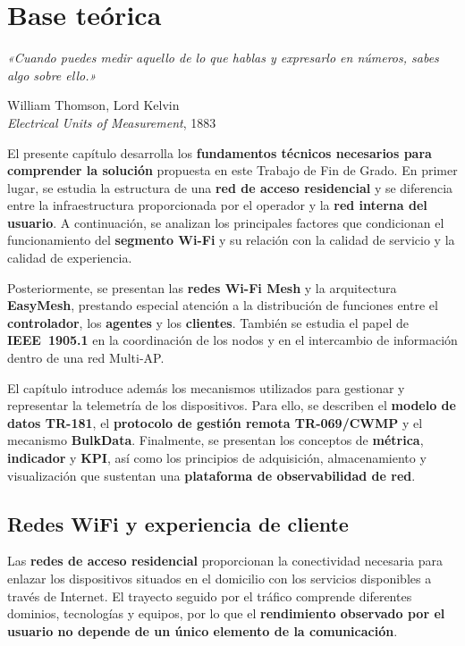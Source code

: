%
%

\chapter{Base teórica}
\label{cha:base-teorica}

\epigraph{
    \textit{«Cuando puedes medir aquello de lo que hablas y expresarlo
    en números, sabes algo sobre ello.»}
}{
    William Thomson, Lord Kelvin\\
    \textit{Electrical Units of Measurement}, 1883
}

El presente capítulo desarrolla los
\textbf{fundamentos técnicos necesarios para comprender la solución}
propuesta en este Trabajo de Fin de Grado. En primer lugar, se estudia la
estructura de una \textbf{red de acceso residencial} y se diferencia
entre la infraestructura proporcionada por el operador y la
\textbf{red interna del usuario}. A continuación, se analizan los
principales factores que condicionan el funcionamiento del
\textbf{segmento Wi-Fi} y su relación con la calidad de servicio y la
calidad de experiencia.

Posteriormente, se presentan las \textbf{redes Wi-Fi Mesh} y la
arquitectura \textbf{EasyMesh}, prestando especial atención a la
distribución de funciones entre el \textbf{controlador}, los
\textbf{agentes} y los \textbf{clientes}. También se estudia el papel de
\textbf{IEEE~1905.1} en la coordinación de los nodos y en el intercambio
de información dentro de una red Multi-AP.

El capítulo introduce además los mecanismos utilizados para gestionar y
representar la telemetría de los dispositivos. Para ello, se describen el
\textbf{modelo de datos TR-181}, el
\textbf{protocolo de gestión remota TR-069/CWMP} y el mecanismo
\textbf{BulkData}. Finalmente, se presentan los conceptos de
\textbf{métrica}, \textbf{indicador} y \textbf{KPI}, así como los
principios de adquisición, almacenamiento y visualización que sustentan
una \textbf{plataforma de observabilidad de red}.

\section{Redes WiFi y experiencia de cliente}
\label{sec:redes-wifi-experiencia-cliente}

Las \textbf{redes de acceso residencial} proporcionan la conectividad
necesaria para enlazar los dispositivos situados en el domicilio con los
servicios disponibles a través de Internet. El trayecto seguido por el
tráfico comprende diferentes dominios, tecnologías y equipos, por lo que
el \textbf{rendimiento observado por el usuario no depende de un único
elemento de la comunicación}.

